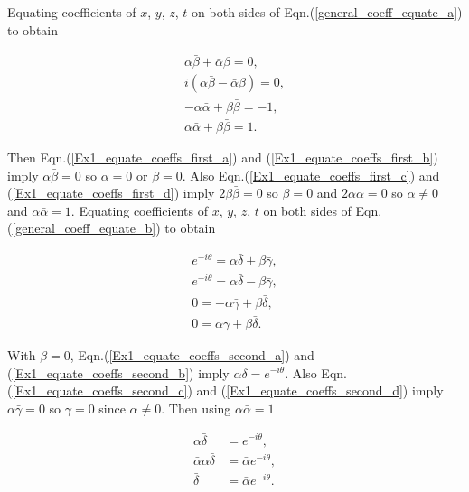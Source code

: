 \noindent Equating coefficients of $x$, $y$, $z$, $t$ on both sides of Eqn.(\ref{general_coeff_equate_a}) to obtain

\begin{subequations}
\begin{gather}\label{Ex1_equate_coeffs_first_a}
\alpha \bar{\beta} + \bar{\alpha} \beta = 0, \\\label{Ex1_equate_coeffs_first_b}
i (\alpha \bar{\beta} - \bar{\alpha} \beta) = 0, \\\label{Ex1_equate_coeffs_first_c}
-\alpha \bar{\alpha} + \beta \bar{\beta} = -1, \\\label{Ex1_equate_coeffs_first_d}
\alpha \bar{\alpha} + \beta \bar{\beta} = 1. 
\end{gather}
\end{subequations}

\noindent Then Eqn.(\ref{Ex1_equate_coeffs_first_a}) and (\ref{Ex1_equate_coeffs_first_b}) imply $\alpha \bar{\beta} = 0$ so $\alpha = 0$ or $\beta = 0$. Also Eqn.(\ref{Ex1_equate_coeffs_first_c}) and (\ref{Ex1_equate_coeffs_first_d}) imply $2\beta\bar{\beta} = 0$ so $\beta = 0$ and $2\alpha \bar{\alpha} = 0$ so $\alpha \neq 0$ and $\alpha \bar{\alpha} = 1$. Equating coefficients of $x$, $y$, $z$, $t$ on both sides of Eqn.(\ref{general_coeff_equate_b}) to obtain

\begin{subequations}
\begin{gather}\label{Ex1_equate_coeffs_second_a}
e^{-i\theta} = \alpha \bar{\delta} + \beta\bar{\gamma}, \\\label{Ex1_equate_coeffs_second_b}
e^{-i\theta} = \alpha \bar{\delta} - \beta\bar{\gamma},\\\label{Ex1_equate_coeffs_second_c}
0 = -\alpha\bar{\gamma} + \beta \bar{\delta},\\\label{Ex1_equate_coeffs_second_d}
0 = \alpha\bar{\gamma} + \beta \bar{\delta}. 
\end{gather}
\end{subequations}

\noindent With $\beta = 0$, Eqn.(\ref{Ex1_equate_coeffs_second_a}) and (\ref{Ex1_equate_coeffs_second_b}) imply $\alpha \bar{\delta} = e^{-i\theta}$. Also Eqn.(\ref{Ex1_equate_coeffs_second_c}) and (\ref{Ex1_equate_coeffs_second_d}) imply $\alpha \bar{\gamma} = 0$ so $\gamma = 0$ since $\alpha \neq 0$. Then using $\alpha \bar{\alpha} =1$

\begin{align*}
\alpha \bar{\delta} & = e^{-i\theta}, \\
\bar{\alpha} \alpha \bar{\delta} & = \bar{\alpha} e^{-i\theta},\\
\bar{\delta}  & =  \bar{\alpha} e^{-i\theta}.
\end{align*}

